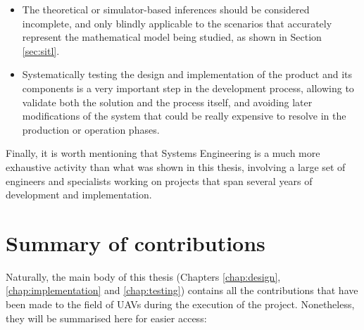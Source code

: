 \begin{itemize}
	\item The theoretical or simulator-based inferences should be considered incomplete, and only blindly applicable to the scenarios that accurately represent the mathematical model being studied, as shown in Section \ref{sec:sitl}.

	\item Systematically testing the design and implementation of the product and its components is a very important step in the development process, allowing to validate both the solution and the process itself, and avoiding later modifications of the system that could be really expensive to resolve in the production or operation phases.

\end{itemize}

Finally, it is worth mentioning that Systems Engineering is a much more exhaustive activity than what was shown in this thesis, involving a large set of engineers and specialists working on projects that span several years of development and implementation.

\section{Summary of contributions}

Naturally, the main body of this thesis (Chapters \ref{chap:design}, \ref{chap:implementation} and \ref{chap:testing}) contains all the contributions that have been made to the field of UAVs during the execution of the project.
Nonetheless, they will be summarised here for easier access:

